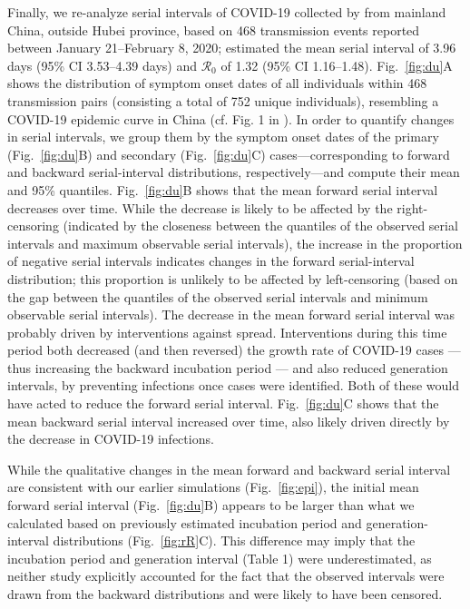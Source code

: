 \documentclass[12pt]{article}
\newcommand{\fref}[1]{Fig.~\ref{fig:#1}}
\newcommand{\Rx}[1]{\ensuremath{{\mathcal R}_{#1}}\xspace}
\newcommand{\Ro}{\Rx{0}}
\begin{document}
Finally, we re-analyze serial intervals of COVID-19 collected by \cite{du2020serial} from mainland China, outside Hubei province, based on 468 transmission events reported between January 21--February 8, 2020;
\cite{du2020serial} estimated the mean serial interval of 3.96 days (95\% CI 3.53–4.39 days) and \Ro of 1.32 (95\% CI 1.16–1.48).
\fref{du}A shows the distribution of symptom onset dates of all individuals within 468 transmission pairs (consisting a total of 752 unique individuals), resembling a COVID-19 epidemic curve in China (cf. Fig. 1 in \cite{pan2020jama}).
In order to quantify changes in serial intervals, we group them by the symptom onset dates of the primary (\fref{du}B) and secondary (\fref{du}C) cases---corresponding to forward and backward serial-interval distributions, respectively---and compute their mean and 95\% quantiles.
\fref{du}B shows that the mean forward serial interval decreases over time.
While the decrease is likely to be affected by the right-censoring (indicated by the closeness between the quantiles of the observed serial intervals and maximum observable serial intervals), the increase in the proportion of negative serial intervals indicates changes in the forward serial-interval distribution;
this proportion is unlikely to be affected by left-censoring (based on the gap between the quantiles of the observed serial intervals and minimum observable serial intervals).
The decrease in the mean forward serial interval was probably driven by interventions against spread.
Interventions during this time period both decreased (and then reversed) the growth rate of COVID-19 cases --- thus increasing the backward incubation period --- and also reduced generation intervals, by preventing infections once cases were identified.
Both of these would have acted to reduce the forward serial interval.
\fref{du}C shows that the mean backward serial interval increased over time, also likely driven directly by the decrease in COVID-19 infections.

While the qualitative changes in the mean forward and backward serial interval are consistent with our earlier simulations (\fref{epi}), the initial mean forward serial interval (\fref{du}B) appears to be larger than what we calculated based on previously estimated incubation period and generation-interval distributions (\fref{rR}C).
This difference may imply that the incubation period and generation interval (Table 1) were underestimated, as neither study explicitly accounted for the fact that the observed intervals were drawn from the backward distributions and were likely to have been censored.
\end{document}
